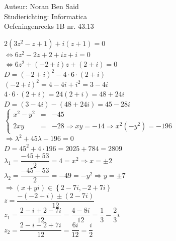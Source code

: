 \documentclass[a4paper]{article}
\begin{document}
  
\noindent \large Auteur: Noran Ben Said \\
\noindent \large Studierichting: Informatica\\
\noindent \large Oefeningenreeks 1B nr. 43.13 \\

\medskip

\normalsize

$2(3z^2 - z + 1) + i(z + 1) = 0$\\

$\Leftrightarrow 6z^2 - 2z + 2 + iz + i = 0$\\

$\Leftrightarrow 6z^2 + (-2+i)z + (2+i) = 0$\\

$D = (-2+i)^2 - 4 \cdot 6 \cdot (2+i)$\\

$(-2+i)^2 = 4 -4i + i^2 = 3 -4i$\\

$4 \cdot 6 \cdot (2+i) = 24(2+i) = 48 + 24i$\\

$D = (3 -4i) - (48 + 24i) = 45 - 28i$\\

$\left\{
	\begin{array}{lll} 
		x^2 - y^2 &=& -45 \\
		2xy &=& -28 \Rightarrow xy = -14 \Rightarrow x^2(-y^2) = -196
	\end{array}
\right.$\\

$\Rightarrow \lambda^2 + 45\lambda -196 = 0$\\

$D = 45^2 + 4 \cdot 196 = 2025 + 784 = 2809$\\

$\lambda_1 = \dfrac{-45+53}{2} = 4 = x^2 \Rightarrow x = \pm2$\\

$\lambda_2 = \dfrac{-45-53}{2} = -49 = -y^2 \Rightarrow y = \pm7$\\

$\Rightarrow (x+yi) \in \left \{ 2-7i , -2+7i \right \}$\\

$z = \dfrac{-(-2+i) \pm (2-7i)}{12}$\\

$z_1 = \dfrac{2 - i + 2 - 7i}{12} = \dfrac{4 - 8i}{12} = \dfrac{1}{3} - \dfrac{2}{3}i$\\

$z_2 = \dfrac{2 - i - 2 + 7i}{12} = \dfrac{6i}{12} = \dfrac{i}{2}$\\
\end{document}
